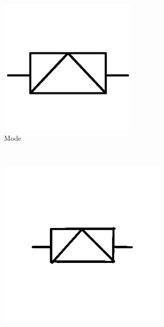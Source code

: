     \begin{figure}[h]
        \centering
                \begin{subfigure}[b]{0.2\textwidth}
                \centering
                \includegraphics[width=0.73\textwidth]{figures/Results/Sketches100f/Model.png}
                \caption{Mode}
        \end{subfigure}\\
                \begin{subfigure}[b]{0.25\textwidth}
                \centering
                \includegraphics[width=0.9\textwidth]{figures/Results/Sketches100f/level1.png}

\end{subfigure}
\end{figure}
